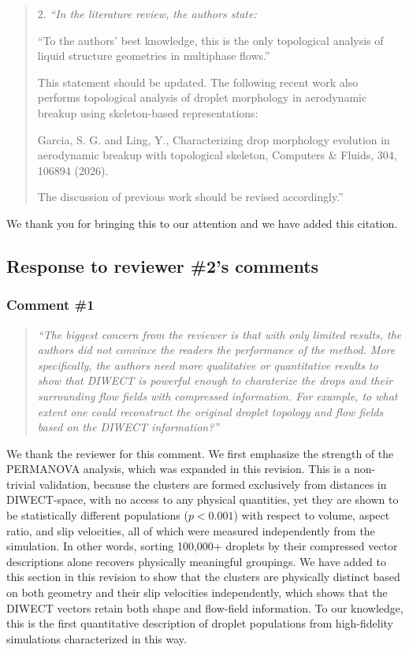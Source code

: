 \documentclass[11pt]{article}
\begin{document}
\begin{quote}
    {2. \it``In the literature review, the authors state:

    “To the authors’ best knowledge, this is the only topological analysis of liquid structure geometries in multiphase flows.”

    This statement should be updated. The following recent work also performs topological analysis of droplet morphology in aerodynamic breakup using skeleton-based representations:

    Garcia, S. G. and Ling, Y., Characterizing drop morphology evolution in aerodynamic breakup with topological skeleton, Computers \& Fluids, 304, 106894 (2026).

    The discussion of previous work should be revised accordingly.''}
\end{quote}

We thank you for bringing this to our attention and we have added this citation.

\subsection*{Response to reviewer \#2's  comments}

\subsubsection*{Comment \#1}
\begin{quote}
    {\it``The biggest concern from the reviewer is that with only limited results, the authors did not convince the readers the performance of the method. More specifically, the authors need more qualitative or quantitative results to show that DIWECT is powerful enough to charaterize the drops and their surrounding flow fields with compressed information. For example, to what extent one could reconstruct the original droplet topology and flow fields based on the DIWECT information?''}
\end{quote}

We thank the reviewer for this comment. We first emphasize the strength of the PERMANOVA analysis, which was expanded in this revision. This is a non-trivial validation, because the clusters are formed exclusively from distances in DIWECT-space, with no access to any physical quantities, yet they are shown to be statistically different populations ($p<0.001$) with respect to volume, aspect ratio, and slip velocities, all of which were measured independently from the simulation. In other words, sorting 100,000+ droplets by their compressed vector descriptions alone recovers physically meaningful groupings. We have added to this section in this revision to show that the clusters are physically distinct based on both geometry and their slip velocities independently, which shows that the DIWECT vectors retain both shape and flow-field information. To our knowledge, this is the first quantitative description of droplet populations from high-fidelity simulations characterized in this way.
\end{document}
